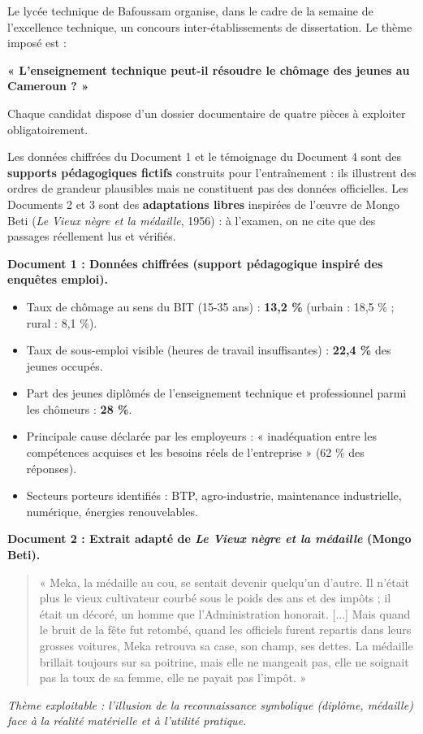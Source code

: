 \documentclass[11pt]{article}
\newcounter{popsec}
\newcounter{popsub}
\newcommand{\courssub}[1]{%
  \stepcounter{popsub}%
  \par\vspace{9pt}\noindent{\popxbold\fontsize{11.5}{13}\selectfont\color{popink}{\color{poporange}\thepopsec.\thepopsub}\hspace{6pt}#1}\par\nopagebreak\vspace{4pt}
}
\begin{document}
\courssub{Situation}
Le lycée technique de Bafoussam organise, dans le cadre de la semaine de l'excellence technique, un concours inter-établissements de dissertation. Le thème imposé est :
\begin{center}
    \textbf{« L'enseignement technique peut-il résoudre le chômage des jeunes au Cameroun ? »}
\end{center}

Chaque candidat dispose d'un dossier documentaire de quatre pièces à exploiter obligatoirement.

\begin{attention}
Les données chiffrées du Document 1 et le témoignage du Document 4 sont des \textbf{supports pédagogiques fictifs} construits pour l'entraînement : ils illustrent des ordres de grandeur plausibles mais ne constituent pas des données officielles. Les Documents 2 et 3 sont des \textbf{adaptations libres} inspirées de l'œuvre de Mongo Beti (\emph{Le Vieux nègre et la médaille}, 1956) : à l'examen, on ne cite que des passages réellement lus et vérifiés.
\end{attention}

\textbf{Document 1 : Données chiffrées (support pédagogique inspiré des enquêtes emploi).}
\begin{itemize}
    \item Taux de chômage au sens du BIT (15-35 ans) : \textbf{13,2 \%} (urbain : 18,5 \% ; rural : 8,1 \%).
    \item Taux de sous-emploi visible (heures de travail insuffisantes) : \textbf{22,4 \%} des jeunes occupés.
    \item Part des jeunes diplômés de l'enseignement technique et professionnel parmi les chômeurs : \textbf{28 \%}.
    \item Principale cause déclarée par les employeurs : « inadéquation entre les compétences acquises et les besoins réels de l'entreprise » (62 \% des réponses).
    \item Secteurs porteurs identifiés : BTP, agro-industrie, maintenance industrielle, numérique, énergies renouvelables.
\end{itemize}

\textbf{Document 2 : Extrait adapté de \emph{Le Vieux nègre et la médaille} (Mongo Beti).}
\begin{quote}
« Meka, la médaille au cou, se sentait devenir quelqu'un d'autre. Il n'était plus le vieux cultivateur courbé sous le poids des ans et des impôts ; il était un décoré, un homme que l'Administration honorait. [...] Mais quand le bruit de la fête fut retombé, quand les officiels furent repartis dans leurs grosses voitures, Meka retrouva sa case, son champ, ses dettes. La médaille brillait toujours sur sa poitrine, mais elle ne mangeait pas, elle ne soignait pas la toux de sa femme, elle ne payait pas l'impôt. »
\end{quote}
\emph{Thème exploitable : l'illusion de la reconnaissance symbolique (diplôme, médaille) face à la réalité matérielle et à l'utilité pratique.}
\end{document}
